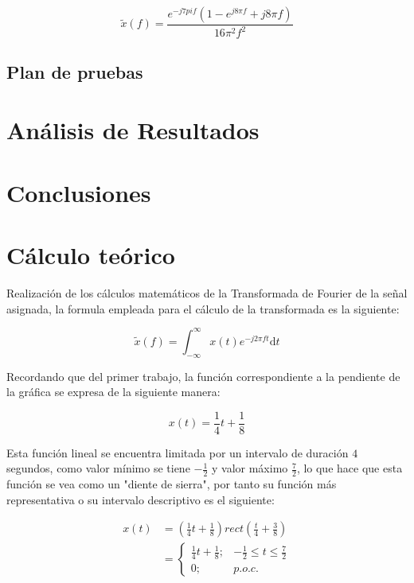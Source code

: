 \documentclass[11pt,a4paper,twocolumn]{article}
\begin{document}
    \begin{equation}
        \tilde{x}(f) = \frac{e^{-j7pi f }(1 - e^{j8\pi f} + j8\pi f)}{16\pi^2 f^2}
    \end{equation} 

    

    \subsection{Plan de pruebas}

\section{Análisis de Resultados}
\section{Conclusiones}

\appendix
\section{Cálculo teórico}

Realización de los cálculos matemáticos de la Transformada de Fourier de la señal 
    asignada, la formula empleada para el cálculo de la transformada es la siguiente:

    \begin{equation}
        \tilde{x}(f)=\int_{-\infty}^{\infty}x(t)e^{-j2\pi ft} \mathrm{d}t
        \label{transformadaFourier}
    \end{equation}

    Recordando que del primer trabajo, la función correspondiente a la pendiente de la 
    gráfica se expresa de la siguiente manera:

    \begin{equation}
        x(t)=\frac{1}{4} t + \frac{1}{8}
        \label{funcionLineal}
    \end{equation}

    Esta función lineal se encuentra limitada por un intervalo de duración $4$ segundos, como valor
    mínimo se tiene $-\frac{1}{2}$ y valor máximo $\frac{7}{2}$, lo que hace que esta 
    función se vea como un "diente de sierra", por tanto su función más representativa o
    su intervalo descriptivo es el siguiente:
    
    \begin{equation}
        \begin{split}
            x(t)&=\left(\frac{1}{4} t + \frac{1}{8}\right)rect\left(\frac{t}{4} + \frac{3}{8}\right) \\
                &=  \left\lbrace  \begin{array}{ll}
                                    \frac{1}{4} t + \frac{1}{8}; & -\frac{1}{2} \leq t \leq \frac{7}{2} \\
                                    0; & p.o.c.
                                \end{array}
                    \right.      
        \end{split}
        \label{dienteSierra}
    \end{equation}
\end{document}
